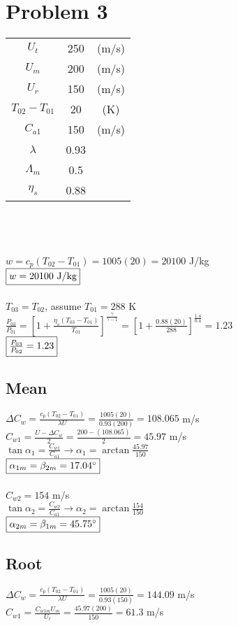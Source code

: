 \documentclass{article}
\begin{document}
\section*{Problem 3}
\begin{tabular}{ccc}
   $U_{t}$ & 250 & (m/s) \\
   $U_{m}$ & 200 & (m/s) \\
   $U_{r}$ & 150 & (m/s) \\
   $T_{02}-T_{01}$ & 20 & (K) \\
   $C_{a1}$ & 150 & (m/s) \\
   $\lambda$ & 0.93 \\
   $\Lambda_m$ & 0.5 \\
   $\eta_s$ & 0.88
\end{tabular} \\\\\\
$w=c_p(T_{02}-T_{01})=1005(20)=20100$ J/kg \\
$\fbox{$w=20100$ J/kg}$ \\\\
$T_{03}=T_{02}$, \quad assume $T_{01}=288$ K \\
$\frac{P_{03}}{P_{01}}=[1+\frac{\eta_s(T_{03}-T_{01})}{T_{01}}]^\frac{\gamma}{\gamma-1}
=[1+\frac{0.88(20)}{288}]^\frac{1.4}{0.4}=1.23$ \\
$\fbox{$\frac{P_{03}}{P_{02}}=1.23$}$

\subsection*{Mean}
$\Delta C_w=\frac{c_p(T_{02}-T_{01})}{\lambda U}=\frac{1005(20)}{0.93(200)}=
108.065$ m/s \\
$C_{w1}=\frac{U-\Delta C_w}{2}=\frac{200-(108.065)}{2}=45.97$ m/s \\
$\tan{\alpha_1}=\frac{C_{w1}}{C_{a1}} \rightarrow \alpha_1=\arctan\frac{45.97}{150}$ \\
$\fbox{$\alpha_{1m}=\beta_{2m}=17.04^\circ$}$ \\\\
$C_{w2}=154$ m/s \\
$\tan{\alpha_2}=\frac{C_{w2}}{C_{a1}} \rightarrow \alpha_2=\arctan\frac{154}{150}$ \\
$\fbox{$\alpha_{2m}=\beta_{1m}=45.75^\circ$}$

\subsection*{Root}
$\Delta C_w=\frac{c_p(T_{02}-T_{01})}{\lambda U}=\frac{1005(20)}{0.93(150)}=
144.09$ m/s \\
$C_{w1}=\frac{C_{w1m}U_{m}}{U_{r}}=\frac{45.97(200)}{150}=61.3$ m/s \\
\end{document}
